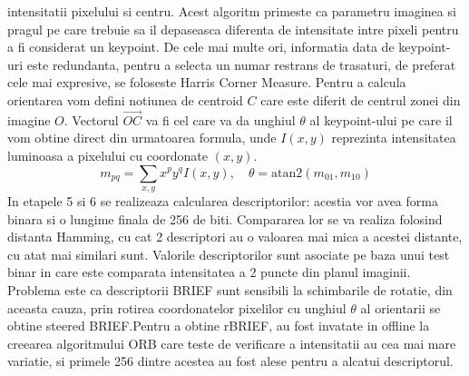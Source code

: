 \documentclass[12pt,a4paper]{report}
\begin{document}
intensitatii pixelului si centru. Acest algoritm primeste ca parametru imaginea si pragul 
pe care trebuie sa il depaseasca diferenta de intensitate intre pixeli pentru a fi considerat
un keypoint. De cele mai multe ori, informatia data de keypoint-uri este redundanta, pentru
a selecta un numar restrans de trasaturi, de preferat cele mai expresive, se foloseste Harris
Corner Measure.  Pentru a calcula orientarea vom defini notiunea de centroid  $ C $ care este
diferit de centrul zonei din imagine $ O $. Vectorul $ \vec{OC} $ va fi cel 
care va da unghiul $ \theta $ al keypoint-ului pe care il vom obtine direct din urmatoarea 
formula, unde $ I(x, y) $ reprezinta intensitatea luminoasa a pixelului cu coordonate $ (x, y) $.      
\begin{equation}
m_{pq} = \sum_{x, y} x^p y^q I(x, y), \quad{}
\theta = \text{atan2}(m_{01}, m_{10})
\end{equation}
In etapele 5 si 6 se realizeaza calcularea descriptorilor: acestia vor avea forma binara si o 
lungime finala de 256 de biti. Compararea lor se va realiza folosind distanta Hamming, cu cat 
2 descriptori au o valoarea mai mica a acestei distante, cu atat mai similari sunt. Valorile 
descriptorilor sunt asociate pe baza unui test binar in care este comparata intensitatea a 2 
puncte din planul imaginii. Problema este ca descriptorii BRIEF sunt sensibili la schimbarile de
rotatie, din aceasta cauza, prin rotirea coordonatelor pixelilor cu unghiul $ \theta $ al 
orientarii se obtine steered BRIEF.\@ Pentru a obtine rBRIEF, au fost invatate in offline la
creearea algoritmului ORB care teste de verificare a intensitatii au cea mai mare variatie, si
primele 256 dintre acestea au fost alese pentru a alcatui descriptorul.       
\end{document}
